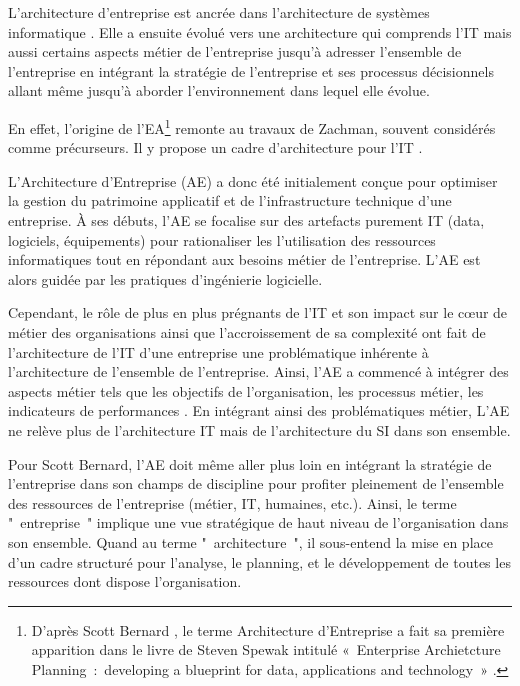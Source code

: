 L'architecture d'entreprise est ancrée dans l'architecture de systèmes 
informatique \cite{kappelman2008enterprise}. Elle a ensuite évolué vers une 
architecture qui comprends l'IT mais aussi certains aspects métier de l'entreprise 
\cite{winter2006essential}  jusqu'à adresser l'ensemble de l'entreprise en 
intégrant la stratégie de l'entreprise et ses processus décisionnels 
\cite{ross2006enterprise} allant même jusqu'à aborder l'environnement dans 
lequel elle évolue.

En effet, l'origine de l'EA\footnote{D'après Scott Bernard 
\cite{bernard2012introduction}, le terme Architecture d'Entreprise a fait sa 
première apparition dans le livre de Steven Spewak intitulé «~Enterprise 
Archietcture Planning~:~developing a blueprint for data, applications and 
technology~» \cite{spewak1993enterprise}.} remonte au travaux de Zachman, souvent 
considérés comme précurseurs. Il y propose un cadre d'architecture pour l'IT 
\cite{zachman1987framework}.

L'Architecture d'Entreprise (AE) a donc été initialement  conçue pour 
optimiser la gestion du patrimoine applicatif et de l'infrastructure technique d'une  
entreprise. À ses débuts, l'AE se focalise sur des artefacts purement IT (data, logiciels, équipements) pour 
rationaliser les l'utilisation des ressources informatiques 
\cite{winter2006essential} tout en répondant aux besoins métier de l'entreprise. 
L'AE est alors guidée par les pratiques d'ingénierie logicielle. 

 

Cependant, le rôle de plus en plus prégnants de l'IT et son impact sur le 
c\oe{}ur de métier des organisations ainsi que l'accroissement de sa complexité 
\cite{ranganathan2005enterprise} ont fait de l'architecture de l'IT d'une 
entreprise une problématique inhérente à l'architecture de l'ensemble de 
l'entreprise. Ainsi, l'AE a commencé à intégrer des aspects métier tels que les 
objectifs de l'organisation, les processus métier, les indicateurs de 
performances \cite{winter2006essential}. En intégrant ainsi des problématiques 
métier, L'AE ne relève plus de l'architecture IT mais de l'architecture du SI 
dans son ensemble.

Pour Scott Bernard, l'AE doit même aller plus loin en intégrant la stratégie de 
l'entreprise \cite{bernard2012introduction} dans son champs de discipline pour 
profiter pleinement de l'ensemble des ressources de l'entreprise (métier, IT, 
humaines, etc.). Ainsi, le terme "~entreprise~" implique une vue stratégique de 
haut niveau de l'organisation dans son ensemble. Quand au terme 
"~architecture~", il sous-entend la mise en place d'un cadre structuré pour 
l'analyse, le planning, et le développement de toutes les ressources dont 
dispose l'organisation. 

